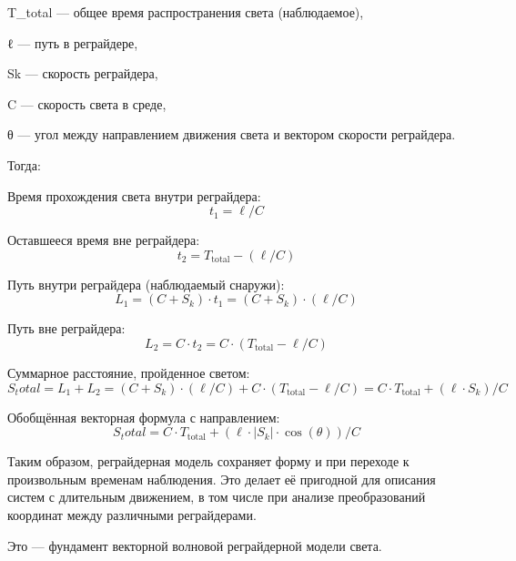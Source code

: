 \documentclass[12pt]{article}
\begin{document}
T_total — общее время распространения света (наблюдаемое),

ℓ — путь в реграйдере,

Sk — скорость реграйдера,

C — скорость света в среде,

θ — угол между направлением движения света и вектором скорости реграйдера.

Тогда:

Время прохождения света внутри реграйдера:
\[
t_1 = \ell / C
\]

Оставшееся время вне реграйдера:
\[
t_2 = T_{\text{total}} - (\ell / C)
\]

Путь внутри реграйдера (наблюдаемый снаружи):
\[
L_1 = (C + S_k) \cdot t_1 = (C + S_k) \cdot (\ell / C)
\]

Путь вне реграйдера:
\[
L_2 = C \cdot t_2 = C \cdot (T_{\text{total}} - \ell / C)
\]

Суммарное расстояние, пройденное светом:
\[
S_total = L_1 + L_2 = (C + S_k) \cdot (\ell / C) + C \cdot (T_{\text{total}} - \ell / C) = C \cdot T_{\text{total}} + (\ell \cdot S_k) / C
\]

Обобщённая векторная формула с направлением:
\[
S_total = C \cdot T_{\text{total}} + (\ell \cdot \left|S_k\right| \cdot \cos(\theta)) / C
\]

Таким образом, реграйдерная модель сохраняет форму и при переходе к произвольным временам наблюдения. Это делает её пригодной для описания систем с длительным движением, в том числе при анализе преобразований координат между различными реграйдерами.

Это — фундамент векторной волновой реграйдерной модели света.
\end{document}

